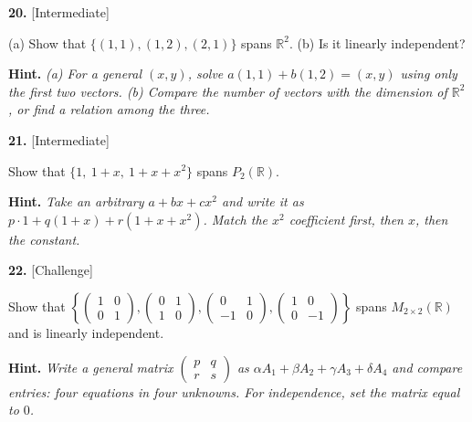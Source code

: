 \documentclass[11pt]{article}
\begin{document}
\begin{minipage}{\linewidth}\textbf{20.} \hfill{\scriptsize\color{ink}[Intermediate]}\par\nopagebreak (a) Show that $\{(1,1),(1,2),(2,1)\}$ spans $\mathbb{R}^{2}$. (b) Is it linearly independent?
\par\smallskip\begingroup\small\color{ink}\textbf{Hint.} \textit{(a) For a general $(x,y)$, solve $a(1,1)+b(1,2)=(x,y)$ using only the first two vectors. (b) Compare the number of vectors with the dimension of $\mathbb{R}^2$, or find a relation among the three.}\endgroup
\vspace{5.0cm}\end{minipage}\par\vspace{4pt}
\begin{minipage}{\linewidth}\textbf{21.} \hfill{\scriptsize\color{ink}[Intermediate]}\par\nopagebreak Show that $\{1,\ 1+x,\ 1+x+x^{2}\}$ spans $P_{2}(\mathbb{R})$.
\par\smallskip\begingroup\small\color{ink}\textbf{Hint.} \textit{Take an arbitrary $a+bx+cx^2$ and write it as $p\cdot1+q(1+x)+r(1+x+x^2)$. Match the $x^2$ coefficient first, then $x$, then the constant.}\endgroup
\vspace{4.6cm}\end{minipage}\par\vspace{4pt}
\begin{minipage}{\linewidth}\textbf{22.} \hfill{\scriptsize\color{ink}[Challenge]}\par\nopagebreak Show that $\left\{\begin{pmatrix}1&0\\0&1\end{pmatrix},\begin{pmatrix}0&1\\1&0\end{pmatrix},\begin{pmatrix}0&1\\-1&0\end{pmatrix},\begin{pmatrix}1&0\\0&-1\end{pmatrix}\right\}$ spans $M_{2\times2}(\mathbb{R})$ and is linearly independent.
\par\smallskip\begingroup\small\color{ink}\textbf{Hint.} \textit{Write a general matrix $\begin{pmatrix}p&q\\r&s\end{pmatrix}$ as $\alpha A_1+\beta A_2+\gamma A_3+\delta A_4$ and compare entries: four equations in four unknowns. For independence, set the matrix equal to $0$.}\endgroup
\vspace{6.0cm}\end{minipage}\par\vspace{4pt}
\end{document}
